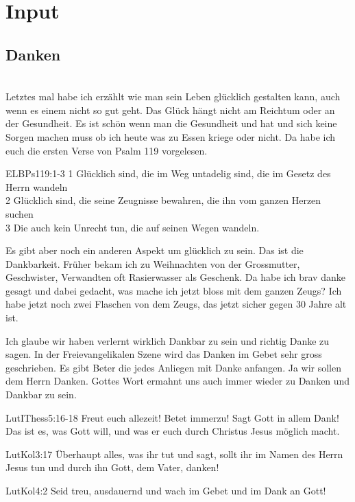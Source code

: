 \documentclass[12pt,a4paper]{scrarticle}
\begin{document}
\section{ Input }
\begin{spacing}{1.5}
\subsection{Danken}\\
Letztes mal habe ich erzählt wie man sein Leben glücklich gestalten kann, auch wenn es einem nicht so gut geht. Das Glück hängt nicht am Reichtum oder an der Gesundheit. Es ist schön wenn man die Gesundheit und hat und sich keine Sorgen machen muss ob ich heute was zu Essen kriege oder nicht. Da habe ich euch die ersten Verse von Psalm 119 vorgelesen.
\begin{bibeltext}{ELB}{Ps}{119:1-3}
1 Glücklich sind, die im Weg untadelig sind, die im Gesetz des Herrn wandeln\\
2 Glücklich sind, die seine Zeugnisse bewahren, die ihn vom ganzen Herzen suchen\\
3 Die auch kein Unrecht tun, die auf seinen Wegen wandeln.
\end{bibeltext}
Es gibt aber noch ein anderen Aspekt um glücklich zu sein. Das ist die Dankbarkeit. Früher bekam ich zu Weihnachten von der Grossmutter, Geschwister, Verwandten oft Rasierwasser als Geschenk. Da habe ich brav danke gesagt und dabei gedacht, was mache ich jetzt bloss mit dem ganzen Zeugs? Ich habe jetzt noch zwei Flaschen von dem Zeugs, das jetzt sicher gegen 30 Jahre alt ist.

Ich glaube wir haben verlernt wirklich Dankbar zu sein und richtig Danke zu sagen. In der Freievangelikalen Szene wird das Danken im Gebet sehr gross geschrieben. Es gibt Beter die jedes Anliegen mit Danke anfangen. Ja wir sollen dem Herrn Danken. Gottes Wort ermahnt uns auch immer wieder zu Danken und Dankbar zu sein.
\begin{bibeltext}{Lut}{IThess}{5:16-18}
Freut euch allezeit! Betet immerzu! Sagt Gott in allem Dank! Das ist es, was Gott will, und was er euch durch Christus Jesus möglich macht.
\end{bibeltext}
\begin{bibeltext}{Lut}{Kol}{3:17}
Überhaupt alles, was ihr tut und sagt, sollt ihr im Namen des Herrn Jesus tun und durch ihn Gott, dem Vater, danken!
\end{bibeltext}
\begin{bibeltext}{Lut}{Kol}{4:2}
Seid treu, ausdauernd und wach im Gebet und im Dank an Gott!
\end{bibeltext}


\end{spacing}
\end{document}
